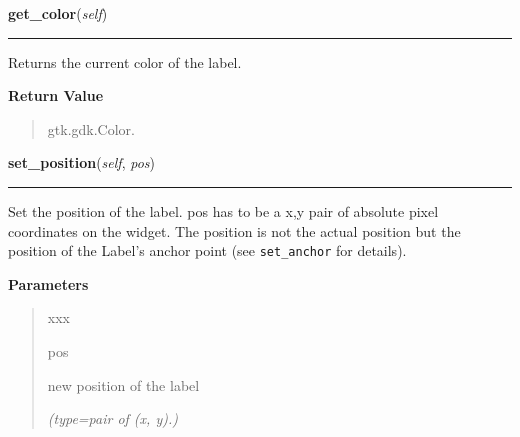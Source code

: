     \label{pygtk_chart:label:Label:get_color}

    \vspace{0.5ex}

\hspace{.8\funcindent}\begin{boxedminipage}{\funcwidth}

    \raggedright \textbf{get\_color}(\textit{self})

    \vspace{-1.5ex}

    \rule{\textwidth}{0.5\fboxrule}
\setlength{\parskip}{2ex}
    Returns the current color of the label.

\setlength{\parskip}{1ex}
      \textbf{Return Value}
    \vspace{-1ex}

      \begin{quote}
      gtk.gdk.Color.

      \end{quote}

    \end{boxedminipage}

    \label{pygtk_chart:label:Label:set_position}

    \vspace{0.5ex}

\hspace{.8\funcindent}\begin{boxedminipage}{\funcwidth}

    \raggedright \textbf{set\_position}(\textit{self}, \textit{pos})

    \vspace{-1.5ex}

    \rule{\textwidth}{0.5\fboxrule}
\setlength{\parskip}{2ex}
    Set the position of the label. pos has to be a x,y pair of absolute 
    pixel coordinates on the widget. The position is not the actual 
    position but the position of the Label's anchor point (see 
    \texttt{set\_anchor} for details).

\setlength{\parskip}{1ex}
      \textbf{Parameters}
      \vspace{-1ex}

      \begin{quote}
        \begin{Ventry}{xxx}

          \item[pos]

          new position of the label

            {\it (type=pair of (x, y).)}

        \end{Ventry}

      \end{quote}

    \end{boxedminipage}

